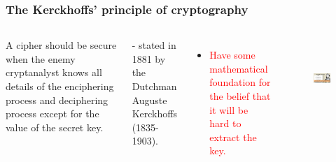 \documentclass{beamer}
\begin{document}
\frame
{
\frametitle{The Kerckhoffs' principle of cryptography}

\begin{columns}[c]
A cipher should be secure when the enemy cryptanalyst knows all details of the enciphering process and deciphering process except for the value of the secret key.

\begin{flushright}
- stated in 1881 by the Dutchman Auguste Kerckhoffs (1835-1903).
\end{flushright}
\begin{itemize}
\setlength{\itemsep}{12pt}
\item \textcolor{red}{Have some mathematical foundation for the belief that it will be hard to extract the key.}
\end{itemize}

\begin{figure}[htbp]
\centering
  \includegraphics[width=4cm, height=3cm]{./pics/Kerckhoffs.jpg}
\end{figure}

\end{columns}
}

%
%
%
%
\end{document}
